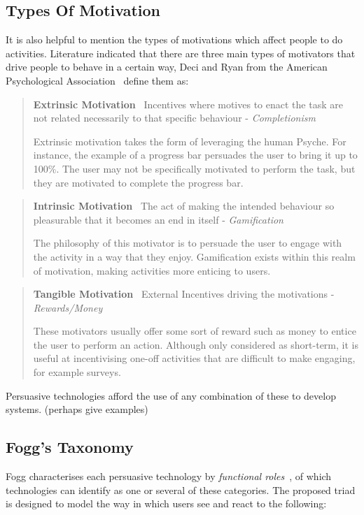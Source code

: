 \subsection{Types Of Motivation}
It is also helpful to mention the types of motivations which affect people to do activities. Literature indicated that there are three main types of motivators that drive people to behave in a certain way, Deci and Ryan from the American Psychological Association~\cite{motivationtypes} define them as:
\begin{quotation}
\noindent
\textbf{Extrinsic Motivation}~ Incentives where motives to enact the task are not related necessarily to that specific behaviour - \textit{Completionism}

Extrinsic motivation takes the form of leveraging the human Psyche. For instance, the example of a progress bar persuades the user to bring it up to 100\%. The user may not be specifically motivated to perform the task, but they are motivated to complete the progress bar.
\end{quotation}
\begin{quotation}
\noindent
\textbf{Intrinsic Motivation}~ The act of making the intended behaviour so pleasurable that it becomes an end in itself - \textit{Gamification}

The philosophy of this motivator is to persuade the user to engage with the activity in a way that they enjoy. Gamification exists within this realm of motivation, making activities more enticing to users.
\end{quotation}
\begin{quotation}
\noindent
\textbf{Tangible Motivation}~ External Incentives driving the motivations - \textit{Rewards/Money}

These motivators usually offer some sort of reward such as money to entice the user to perform an action. Although only considered as short-term, it is useful at incentivising one-off activities that are difficult to make engaging, for example surveys. 
\end{quotation}

Persuasive technologies afford the use of any combination of these to develop systems. (perhaps give examples)

\subsection{Fogg's Taxonomy}
Fogg characterises each persuasive technology by \emph{functional roles}~\cite{fogg1998persuasive}, of which technologies can identify as one or several of these categories. The proposed triad is designed to model the way in which users see and react to the following:


